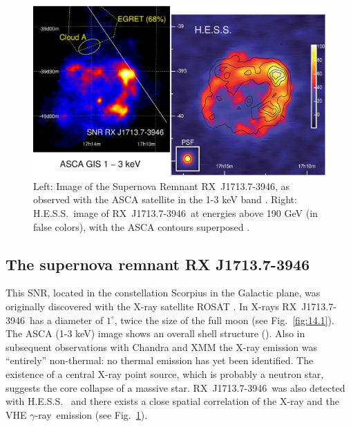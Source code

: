 \documentclass{svjour3x}                     %
\newcommand{\gr}{$\gamma$-ray}
\newcommand{\rxj}{RX~J1713.7-3946}
\newcommand{\hess}{H.E.S.S.}
\begin{document}
\begin{figure}
  \includegraphics[width=\textwidth]{RXJ1713_images.eps}
  \caption[\rxj]{Left: Image of the Supernova Remnant \rxj, as observed with the
    ASCA satellite in the 1-3 keV band \cite{uchiyama02}.  Right: \hess\ image of \rxj\ at
    energies above 190 GeV (in false colors), with the ASCA contours
    superposed \cite{aha07}.}
  \label{fig:14.1}       %
  \label{fig:14.2}       %
\end{figure}
%

\subsection{The supernova remnant RX J1713.7-3946}

This SNR, located in the constellation Scorpius in the Galactic plane, was
originally discovered with the X-ray satellite ROSAT \cite{pfeffermann96}. In
X-rays \rxj\ has a diameter of $1^{\circ}$, twice the size of the full moon
(see Fig.~\ref{fig:14.1}). The ASCA (1-3 keV) image shows an overall shell
structure (\cite{uchiyama02}). Also in subsequent observations with Chandra and
XMM the X-ray emission was ``entirely'' non-thermal: no thermal emission has yet
been identified. The existence of a central X-ray point source, which is
probably a neutron star, suggests the core collapse of a massive star. \rxj\ was
also detected with \hess\ \cite{aha04,aha06} and there exists a close spatial
correlation of the X-ray and the VHE \gr\ emission (see Fig.~\ref{fig:14.2}).
\end{document}
